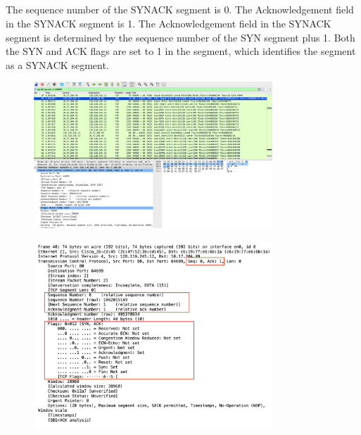 \documentclass{article}
\begin{document}
\begin{CJK*}{UTF8}{gbsn}
\subsection{}
The sequence number of the SYNACK segment is 0.
The Acknowledgement field in the SYNACK segment is 1.
The Acknowledgement field in the SYNACK segment is determined by the sequence number of the SYN segment plus 1.
Both the SYN and ACK flags are set to 1 in the segment, which identifies the segment as a SYNACK segment.
\begin{figure}[H]
    \centering
    \includegraphics[width=0.8\textwidth]{5-1.png}
\end{figure}
\begin{figure}[H]
    \centering
    \includegraphics[width=0.8\textwidth]{5-2.png}
\end{figure}

\end{CJK*}
\end{document}
